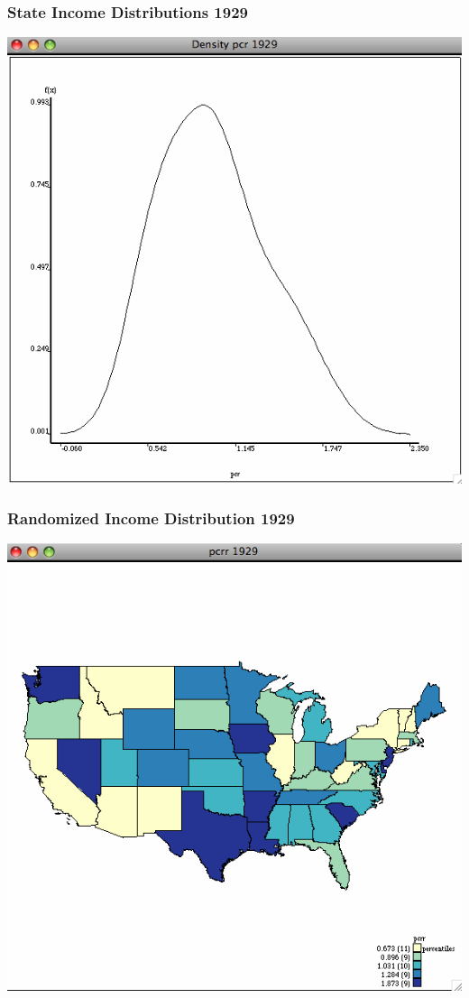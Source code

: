 \documentclass[nototal,handout]{beamer}
\begin{document}
\begin{frame}
	\frametitle{State Income Distributions 1929}
 \begin{center}
 \includegraphics[width=.65\linewidth]{density29.png}
  \end{center}
 \end{frame} 

\begin{frame}
	\frametitle{Randomized Income Distribution 1929}
 \begin{center}
 \includegraphics[width=.65\linewidth]{income29random.png}
  \end{center}
 \end{frame} 
\end{document}
